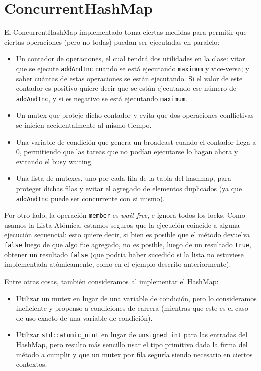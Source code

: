 \section{ConcurrentHashMap}

El ConcurrentHashMap implementado toma ciertas medidas para permitir que ciertas operaciones (pero no todas) puedan ser ejecutadas en paralelo:

\begin{itemize}

	\item Un contador de operaciones, el cual tendrá dos utilidades en la clase: vitar que se ejecute \texttt{addAndInc} cuando se está ejecutando \texttt{maximum} y vice-versa; y saber cuántas de estas operaciones se están ejecutando. Si el valor de este contador es positivo quiere decir que se están ejecutando ese número de \texttt{addAndInc}, y si es negativo se está ejecutando \texttt{maximum}.

	\item Un mutex que proteje dicho contador y evita que dos operaciones conflictivas se inicien accidentalmente al mismo tiempo.

	\item Una variable de condición que genera un broadcast cuando el contador llega a 0, permitiendo que las tareas que no podían ejecutarse lo hagan ahora y evitando el busy waiting.

	\item Una lista de mutexes, uno por cada fila de la tabla del hashmap, para proteger dichas filas y evitar el agregado de elementos duplicados (ya que \texttt{addAndInc} puede ser concurrente con si mismo).

\end{itemize}

Por otro lado, la operación \texttt{member} es \textit{wait-free}, e ignora todos los locks. Como usamos la Lista Atómica, estamos seguros que la ejecución coincide a alguna ejecución secuencial: esto quiere decir, si bien es posible que el método devuelva \texttt{false} luego de que algo fue agregado, no es posible, luego de un resultado \texttt{true}, obtener un resultado \texttt{false} (que podría haber sucedido si la lista no estuviese implementada atómicamente, como en el ejemplo descrito anteriormente).

Entre otras cosas, también consideramos al implementar el HashMap:

\begin{itemize}

	\item Utilizar un mutex en lugar de una variable de condición, pero lo consideramos ineficiente y propenso a condiciones de carrera (mientras que este es el caso de uso exacto de una variable de condición).

	\item Utilizar \texttt{std::atomic\_uint} en lugar de \texttt{unsigned int} para las entradas del HashMap, pero resulto más sencillo usar el tipo primitivo dada la firma del método a cumplir y que un mutex por fila seguría siendo necesario en ciertos contextos.

\end{itemize}

